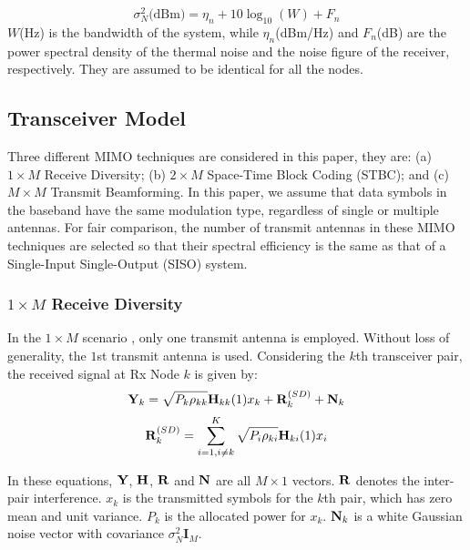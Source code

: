 \documentclass[draftcls,onecolumn,peerview,12pt]{IEEEtran}
\begin{document}
\begin{equation}
\sigma_{N}^{2}\textrm{(dBm)} = \eta_{n} + 10\log_{10}(W) + F_{n}
\end{equation}
$W$(Hz) is the bandwidth of the system, while $\eta_{n}$(dBm/Hz) and
$F_{n}$(dB) are the power spectral density of the thermal noise and
the noise figure of the receiver, respectively. They are assumed to
be identical for all the nodes.

\subsection{Transceiver Model}
Three different MIMO techniques are considered in this paper, they
are: (a) $1 \times M$ Receive Diversity; (b) $2 \times M$ Space-Time
Block Coding (STBC); and (c) $M \times M$ Transmit Beamforming. In
this paper, we assume that data symbols in the baseband have the
same modulation type, regardless of single or multiple antennas. For
fair comparison, the number of transmit antennas in these MIMO
techniques are selected so that their spectral efficiency is the
same as that of a Single-Input Single-Output (SISO) system.

\subsubsection{$1 \times M$ Receive Diversity}

In the $1 \times M$ scenario \cite{14_Wireless_Comm}, only one
transmit antenna is employed. Without loss of generality, the $1$st
transmit antenna is used. Considering the $k$th transceiver pair,
the received signal at Rx Node $k$ is given by:
\begin{equation}
{\rm {\bf Y}}_k =\sqrt {P_k \rho _{kk} } {\rm {\bf H}}_{kk} (1)x_k
+{\rm {\bf R}}_k^{(SD)} +{\rm {\bf N}}_k
\end{equation}
\begin{equation}
{\rm {\bf R}}_k^{(SD)} = \sum_{i=1,i\neq k}^{K} \sqrt {P_i \rho
_{ki} } {\rm {\bf H}}_{ki}(1)x_i
\end{equation}

In these equations, $\rm{\bf Y}$, $\rm{\bf H}$, $\rm{\bf R}$ and
$\rm{\bf N}$ are all $M\times 1$ vectors. $\rm{\bf R}$ denotes the
inter-pair interference. $x_k$ is the transmitted symbols for the
$k$th pair, which has zero mean and unit variance. $P_{k}$ is the
allocated power for $x_k$. ${\rm{\bf N}}_k$ is a white Gaussian
noise vector with covariance $\sigma_{N}^{2}\textbf{I}_{M}$.
\end{document}
